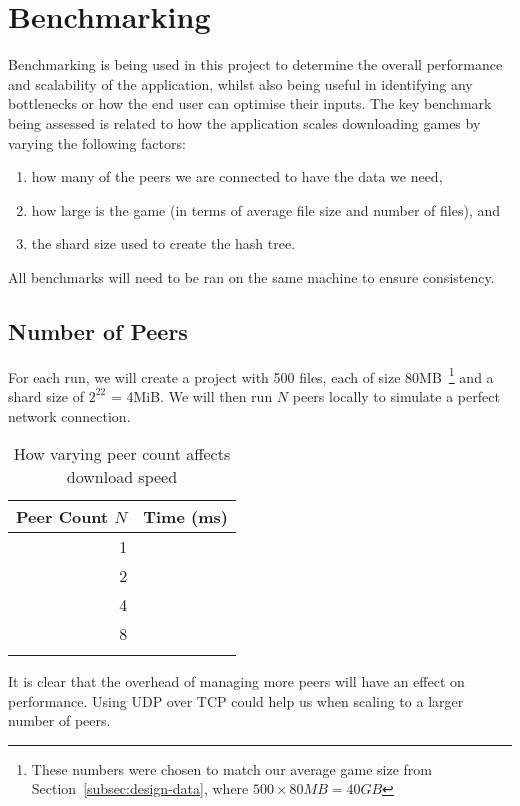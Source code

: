 
\section{Benchmarking}\label{sec:benchmark}

Benchmarking is being used in this project to determine the overall performance and scalability of the application, whilst also being useful in identifying any bottlenecks or how the end user can optimise their inputs. The key benchmark being assessed is related to how the application scales downloading games by varying the following factors:

\begin{enumerate}
  \item how many of the peers we are connected to have the data we need,
  \item how large is the game (in terms of average file size and number of files), and
  \item the shard size used to create the hash tree.
\end{enumerate}

\vspace{2mm}\noindent
All benchmarks will need to be ran on the same machine to ensure consistency.

\subsection*{Number of Peers}

For each run, we will create a project with 500 files, each of size 80MB~\footnote{These numbers were chosen to match our average game size from Section~\ref{subsec:design-data}, where $500\times 80MB = 40GB$} and a shard size of $2^{22}$ = 4MiB. We will then run $N$ peers locally to simulate a perfect network connection.

\begin{longtable}{ | r | r | }
  \hline
  \textbf{Peer Count $N$} & \textbf{Time (ms)} \\\hline
  1
  &
  \\\hline
  2
  &
  \\\hline
  4
  &
  \\\hline
  8
  &
  \\\hline
  \caption{How varying peer count affects download speed}
\end{longtable}

It is clear that the overhead of managing more peers will have an effect on performance. Using UDP over TCP could help us when scaling to a larger number of peers.

